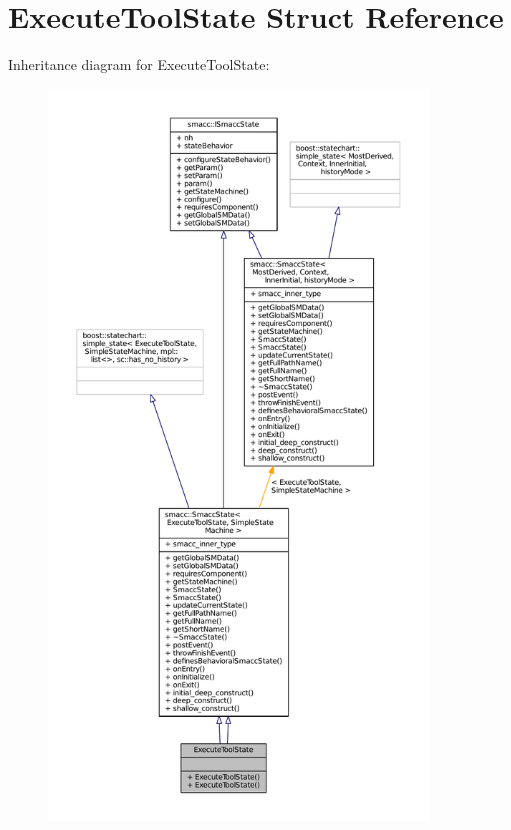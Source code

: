 \hypertarget{structExecuteToolState}{}\section{Execute\+Tool\+State Struct Reference}
\label{structExecuteToolState}


Inheritance diagram for Execute\+Tool\+State\+:
\nopagebreak
\begin{figure}[H]
\begin{center}
\leavevmode
\includegraphics[height=550pt]{structExecuteToolState__inherit__graph}
\end{center}
\end{figure}


